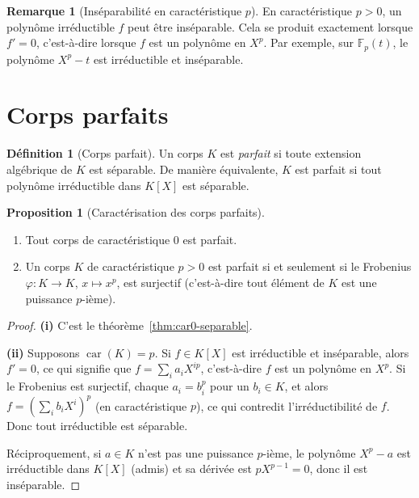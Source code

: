 \documentclass[12pt,a4paper,openany]{book}
\theoremstyle{definition}
\newtheorem{definition}{Définition}[chapter]
\newtheorem{proposition}{Proposition}[chapter]
\newtheorem{remarque}{Remarque}[chapter]
\newcommand{\F}{\mathbb{F}}
\newcommand{\car}{\operatorname{car}}
\begin{document}
\begin{remarque}[Inséparabilité en caractéristique $p$]
\label{rem:inseparable}
En caractéristique $p > 0$, un polynôme irréductible $f$ peut être inséparable.
Cela se produit exactement lorsque $f' = 0$, c'est-à-dire lorsque $f$ est un
polynôme en $X^p$. Par exemple, sur $\F_p(t)$, le polynôme $X^p - t$ est
irréductible et inséparable.
\end{remarque}

\section{Corps parfaits}
\label{sec:parfaits}

\begin{definition}[Corps parfait]\label{def:corps-parfait}
Un corps $K$ est \emph{parfait} si toute extension algébrique de $K$ est séparable.
De manière équivalente, $K$ est parfait si tout polynôme irréductible dans $K[X]$
est séparable.
\end{definition}

\begin{proposition}[Caractérisation des corps parfaits]\label{prop:parfait-car}
\begin{enumerate}[label=(\roman*)]
  \item Tout corps de caractéristique $0$ est parfait.
  \item Un corps $K$ de caractéristique $p > 0$ est parfait si et seulement si
    le Frobenius $\varphi \colon K \to K$, $x \mapsto x^p$, est surjectif
    (c'est-à-dire tout élément de $K$ est une puissance $p$-ième).
\end{enumerate}
\end{proposition}

\begin{proof}
\textbf{(i)} C'est le théorème~\ref{thm:car0-separable}.

\textbf{(ii)} Supposons $\car(K) = p$. Si $f \in K[X]$ est irréductible et
inséparable, alors $f' = 0$, ce qui signifie que $f = \sum_{i} a_i X^{ip}$,
c'est-à-dire $f$ est un polynôme en $X^p$. Si le Frobenius est surjectif,
chaque $a_i = b_i^p$ pour un $b_i \in K$, et alors
$f = \left(\sum_i b_i X^i\right)^p$ (en caractéristique $p$), ce qui contredit
l'irréductibilité de $f$. Donc tout irréductible est séparable.

Réciproquement, si $a \in K$ n'est pas une puissance $p$-ième, le polynôme
$X^p - a$ est irréductible dans $K[X]$ (admis) et sa dérivée est $pX^{p-1} = 0$,
donc il est inséparable.
\end{proof}
\end{document}
